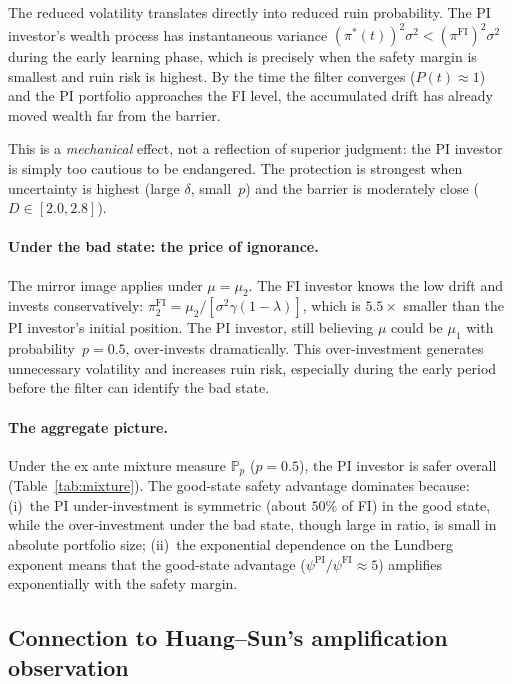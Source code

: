 \documentclass[12pt]{article}
\theoremstyle{remark}
\theoremstyle{definition}
\newcommand{\Prob}{\mathbb{P}}
\newcommand{\FI}{\mathrm{FI}}
\newcommand{\PI}{\mathrm{PI}}
\begin{document}
The reduced volatility translates directly into reduced ruin
probability.
The PI investor's wealth process has instantaneous variance
$(\pi^*(t))^2\sigma^2 < (\pi^{\FI})^2\sigma^2$ during the early
learning phase, which is precisely when the safety margin is
smallest and ruin risk is highest.
By the time the filter converges ($P(t) \approx 1$) and the PI
portfolio approaches the FI level, the accumulated drift has
already moved wealth far from the barrier.

This is a \emph{mechanical} effect, not a reflection of superior
judgment: the PI investor is simply too cautious to be endangered.
The protection is strongest when uncertainty is highest (large
$\delta$, small~$p$) and the barrier is moderately close
($D \in [2.0, 2.8]$).

\paragraph{Under the bad state: the price of ignorance.}
The mirror image applies under $\mu = \mu_2$.
The FI investor knows the low drift and invests conservatively:
$\pi_2^{\FI} = \mu_2/[\sigma^2\gamma(1-\lambda)]$, which is
$5.5\times$ smaller than the PI investor's initial position.
The PI investor, still believing $\mu$ could be $\mu_1$ with
probability~$p = 0.5$, over-invests dramatically.
This over-investment generates unnecessary volatility and
increases ruin risk, especially during the early period before
the filter can identify the bad state.

\paragraph{The aggregate picture.}
Under the ex ante mixture measure $\Prob_p$
($p = 0.5$), the PI investor is safer overall
(Table~\ref{tab:mixture}).
The good-state safety advantage dominates because:
(i)~the PI under-investment is symmetric (about $50\%$ of FI)
in the good state, while the over-investment under the bad state,
though large in ratio, is small in absolute portfolio size;
(ii)~the exponential dependence on the Lundberg exponent means
that the good-state advantage ($\psi^{\PI}/\psi^{\FI} \approx 5$)
amplifies exponentially with the safety margin.


\subsection{Connection to Huang--Sun's amplification observation}
\label{sec:discuss_HS}
\end{document}
